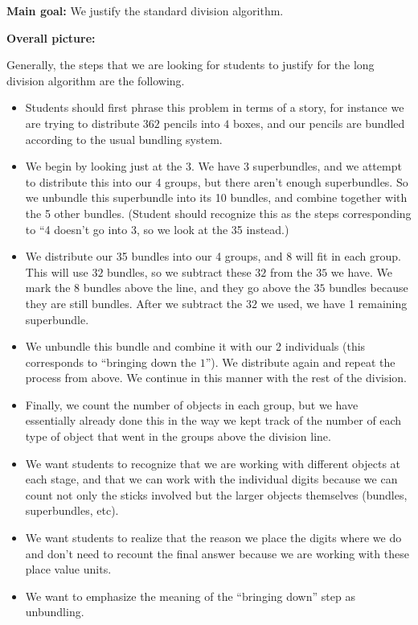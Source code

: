 \documentclass[nooutcomes,noauthor]{ximera}
\begin{document}
\begin{instructorNotes} 



{\bf Main goal:} We justify the standard division algorithm.


{\bf Overall picture:} 


Generally, the steps that we are looking for students to justify for the long division algorithm are the following.
\begin{itemize}
	\item Students should first phrase this problem in terms of a story, for instance we are trying to distribute $362$ pencils into $4$ boxes, and our pencils are bundled according to the usual bundling system.
	\item We begin by looking just at the $3$. We have 3 superbundles, and we attempt to distribute this into our 4 groups, but there aren't enough superbundles. So we unbundle this superbundle into its 10 bundles, and combine together with the 5 other bundles. (Student should recognize this as the steps corresponding to ``4 doesn't go into 3, so we look at the 35 instead.)
	\item We distribute our 35 bundles into our 4 groups, and $8$ will fit in each group. This will use $32$ bundles, so we subtract these $32$ from the $35$ we have. We mark the $8$ bundles above the line, and they go above the $35$ bundles because they are still bundles. After we subtract the $32$ we used, we have 1 remaining superbundle.
	\item We unbundle this bundle and combine it with our 2 individuals (this corresponds to ``bringing down the $1$''). We distribute again and repeat the process from above. We continue in this manner with the rest of the division.
	\item Finally, we count the number of objects in each group, but we have essentially already done this in the way we kept track of the number of each type of object that went in the groups above the division line.
	\item We want students to recognize that we are working with different objects at each stage, and that we can work with the individual digits because we can count not only the sticks involved but the larger objects themselves (bundles, superbundles, etc).
	\item We want students to realize that the reason we place the digits where we do and don't need to recount the final answer because we are working with these place value units.
	\item We want to emphasize the meaning of the ``bringing down'' step as unbundling.

\end{itemize}
\end{instructorNotes}
\end{document}
